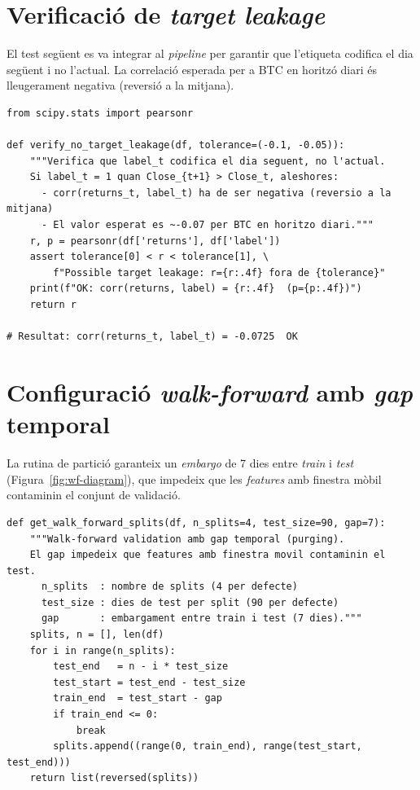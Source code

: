 \documentclass[10pt,twocolumn,a4paper]{article}
\begin{document}
\onecolumn
\appendix

\section{Verificació de \textit{target leakage}}
El test següent es va integrar al \textit{pipeline} per garantir que l'etiqueta
codifica el dia següent i no l'actual. La correlació esperada per a BTC en horitzó
diari és lleugerament negativa (reversió a la mitjana).
\begin{lstlisting}
from scipy.stats import pearsonr

def verify_no_target_leakage(df, tolerance=(-0.1, -0.05)):
    """Verifica que label_t codifica el dia seguent, no l'actual.
    Si label_t = 1 quan Close_{t+1} > Close_t, aleshores:
      - corr(returns_t, label_t) ha de ser negativa (reversio a la mitjana)
      - El valor esperat es ~-0.07 per BTC en horitzo diari."""
    r, p = pearsonr(df['returns'], df['label'])
    assert tolerance[0] < r < tolerance[1], \
        f"Possible target leakage: r={r:.4f} fora de {tolerance}"
    print(f"OK: corr(returns, label) = {r:.4f}  (p={p:.4f})")
    return r

# Resultat: corr(returns_t, label_t) = -0.0725  OK
\end{lstlisting}

\section{Configuració \textit{walk-forward} amb \textit{gap} temporal}
La rutina de partició garanteix un \textit{embargo} de 7 dies entre \textit{train} i
\textit{test} (Figura~\ref{fig:wf-diagram}), que impedeix que les \textit{features}
amb finestra mòbil contaminin el conjunt de validació.
\begin{lstlisting}
def get_walk_forward_splits(df, n_splits=4, test_size=90, gap=7):
    """Walk-forward validation amb gap temporal (purging).
    El gap impedeix que features amb finestra movil contaminin el test.
      n_splits  : nombre de splits (4 per defecte)
      test_size : dies de test per split (90 per defecte)
      gap       : embargament entre train i test (7 dies)."""
    splits, n = [], len(df)
    for i in range(n_splits):
        test_end   = n - i * test_size
        test_start = test_end - test_size
        train_end  = test_start - gap
        if train_end <= 0:
            break
        splits.append((range(0, train_end), range(test_start, test_end)))
    return list(reversed(splits))
\end{lstlisting}
\end{document}
